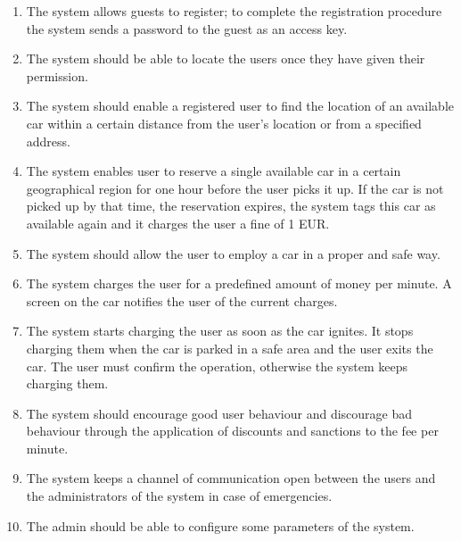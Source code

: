 			
			
			
			\begin{enumerate}
				\item The system allows guests to register; to complete the registration procedure the system sends a password to the guest as an access key.
				\item The system should be able to locate the users once they have given their permission.
				\item The system should enable a registered user to find the location of an available car within a certain distance from the user's location or from a specified address.
				\item The system enables user to reserve a single available car in a certain geographical region for one hour before the user picks it up. If the car is not picked up by that time, the reservation expires, the system tags this car as available again and it charges the user a fine of 1 EUR.
				
				\item The system should allow the user to employ a car in a proper and safe way. 				
								
				\item The system charges the user for a predefined amount of money per minute. A screen on the car notifies the user of the current charges.
				\item The system starts charging the user as soon as the car ignites. It stops charging them when the car is parked in a safe area and the user exits the car. The user must confirm the operation, otherwise the system keeps charging them. 
				\item The system should encourage good user behaviour and discourage bad behaviour through the application of discounts and sanctions to the fee per minute. 
				\item The system keeps a channel of communication open between the users and the administrators of the system in case of emergencies. 
				
				\item The admin should be able to configure some parameters of the system.
			\end{enumerate}						
			
			
			

